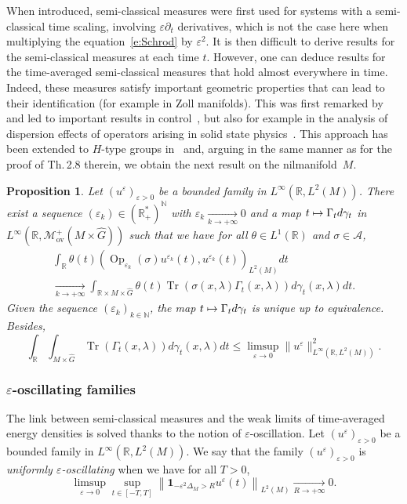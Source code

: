 \documentclass[JEP,XML,SOM,Unicode,published]{cedram}
\let\mathcal\mathscr
\newcommand\mto{\mathchoice{\longmapsto}{\mapsto}{\mapsto}{\mapsto}}
\newcommand{\rov}{\mathrm{ov}}
\newcommand{\bun}{\mathbf{1}}
\DeclareMathOperator{\Op}{Op}
\DeclareMathOperator{\Tr}{Tr}
\theoremstyle{plain}
\newtheorem{proposition}[theorem]{Proposition}
\theoremstyle{definition}
\let\eps\varepsilon
\def\R{{\mathbb R}}
\def\N{{\mathbb N}}
\newcommand{\Tend}[2]{\mathbin{\mathop{\longrightarrow}\limits_{#1\to#2}}}
\begin{document}
When introduced, semi-classical measures were first used for systems with a semi-classical time scaling, \ie involving $\eps \partial_t$ derivatives, which is not the case here when multiplying the equation~\eqref{e:Schrod} by $\eps^2$. It is then difficult to derive results for the semi-classical measures at each time $t$. However, one can deduce results for the time-averaged semi-classical measures that hold almost everywhere in time. Indeed, these measures satisfy important geometric properties that can lead to their identification (for example in Zoll manifolds).
This was first remarked by~\cite{MaciaTorus} and led to important results in control~\cite{AM14,AFM15, MacRiv19}, but also for example in the analysis of dispersion effects of operators arising in solid state physics~\cite{CFM19,CFM20}. This approach has been extended to $H$-type groups in~\cite{FF} and, arguing in the same manner as for the proof of Th.\,2.8 therein, we obtain the next result on the nilmanifold~$M$.

\begin{proposition}\label{prop:semiclas}
Let $(u^\eps)_{\eps>0}$ be a bounded family in $L^\infty(\R,L^2(M))$. There exist a sequence $(\eps_k)\in(\R_+^*)^{\N}$ with $\eps_k \underset{k\to +\infty}{\longrightarrow} 0$ and a map $t\mto \Gamma_t d\gamma_t$ in $L^\infty(\R,\mathcal{M}_{\rov}^+(M\times \widehat{G}))$ such that we have for all $\theta\in L^1(\R)$ and $\sigma\in\mathcal{A}$,
\begin{multline*}
\int_\R \theta(t)(\Op_{\eps_k}(\sigma)u^{\eps_k}(t),u^{\eps_k}(t))_{L^2(M)} dt\\[-8pt]
\underset{k\to +\infty}{\longrightarrow} \int_{\R\times M\times\widehat{G}} \theta(t)\Tr(\sigma(x,\lambda)\Gamma_t(x,\lambda))d\gamma_t(x,\lambda)dt.
\end{multline*}
Given the sequence $(\eps_k)_{k\in\N}$, the map $t\mto \Gamma_td\gamma_t$ is unique up to equivalence. Besides,
\begin{equation*}
\int_\R\int_{M\times \widehat{G}}\Tr(\Gamma_t(x,\lambda))d\gamma_t(x,\lambda)dt\leq \limsup_{\eps\to 0}\|u^\eps\|^2_{L^\infty(\R,L^2(M))}.
\end{equation*}
\end{proposition}

\subsubsection{$\eps$-oscillating families} \label{s:epsosc}
The link between semi-classical measures and the weak limits of time-averaged energy densities is solved thanks to the notion of $\eps$-oscillation.
Let $(u^\eps)_{\eps>0}$ be a bounded family in $L^\infty(\R,L^2(M))$.
We say that the family $(u^\eps)_{\eps>0}$ is \emph{uniformly $\eps$-oscillating} when we have for all $T>0$,
\[
\limsup_{\eps\to 0} \sup_{t\in[-T,T]} \left\|\bun_{-\eps^2{\Delta}_M>R} u^\eps(t)
\right\|_{L^2(M)}\Tend{R}{+\infty}0.
\]
\end{document}
